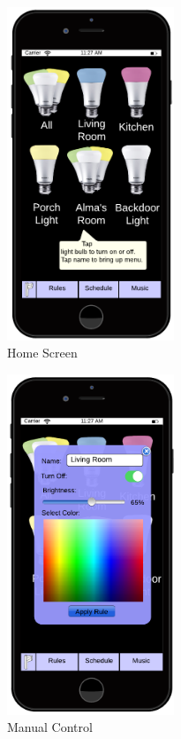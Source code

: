 \documentclass[12pt]{article}
\begin{document}
  \begin{figure}[ht!]
    \centering
    \includegraphics[width=50mm]{Home.png}
    \caption{Home Screen}
    \label{fig:home}
  \end{figure}
  
  \begin{figure}[ht!]
    \centering
    \includegraphics[width=50mm]{ManualControl.png}
    \caption{Manual Control}
    \label{fig:singleControl}
  \end{figure}
  
\end{document}
